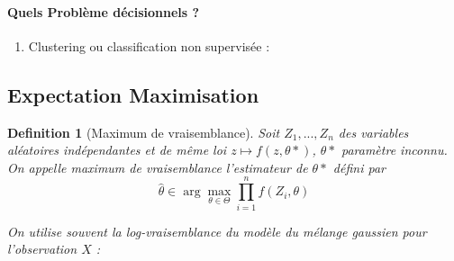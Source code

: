 \documentclass{article}
\newtheorem{defi}{Definition}
\begin{document}
\paragraph{Quels Problème décisionnels ?}

\begin{enumerate}
\item Clustering ou classification non supervisée : 
\end{enumerate}


\subsection{Expectation Maximisation}

\begin{defi}[Maximum de vraisemblance]
Soit $Z_1,...,Z_n$ des variables aléatoires indépendantes et de même loi $z \mapsto f(z,\theta*)$,  $\theta*$ paramètre inconnu. On appelle maximum de vraisemblance l'estimateur de $\theta*$ défini par 
\[\hat{\theta} \in \arg \max_{\theta\in\Theta} \prod_{i=1}^n f(Z_i, \theta)\]

On utilise souvent la log-vraisemblance du modèle du mélange gaussien pour l'observation $X$ :



\end{defi}
\end{document}
